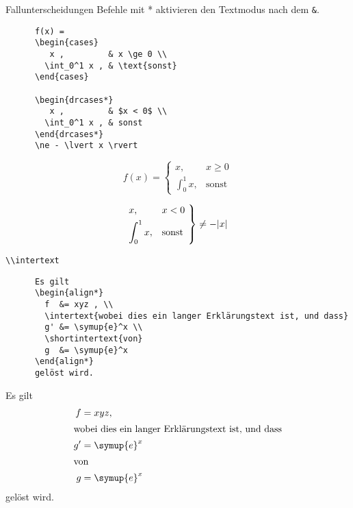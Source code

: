 \begin{frame}[fragile]{Fallunterscheidungen}
  Befehle mit * aktivieren den Textmodus nach dem \lstinline+&+.
  \begin{CodeExample}{0.55}
    \begin{lstlisting}
      f(x) =
      \begin{cases}
         x ,         & x \ge 0 \\
        \int_0^1 x , & \text{sonst}
      \end{cases}

      \begin{drcases*}
         x ,         & $x < 0$ \\
        \int_0^1 x , & sonst
      \end{drcases*}
      \ne - \lvert x \rvert
    \end{lstlisting}
  \CodeResult
    \begin{equation*}
      f(x) =
      \begin{cases}
         x ,         & x \ge 0 \\
        \int_0^1 x , & \text{sonst}
      \end{cases}
    \end{equation*}

    \vspace{5em}
    \begin{equation*}
      \begin{drcases*}
         x ,         & $x < 0$ \\
        \int_0^1 x , & sonst
      \end{drcases*}
      \ne - \lvert x \rvert
    \end{equation*}
  \end{CodeExample}
\end{frame}

\begin{frame}[fragile]{\lstinline+\\intertext+}
  \begin{CodeExample}{0.60}
    \begin{lstlisting}
      Es gilt
      \begin{align*}
        f  &= xyz , \\
        \intertext{wobei dies ein langer Erklärungstext ist, und dass}
        g' &= \symup{e}^x \\
        \shortintertext{von}
        g  &= \symup{e}^x
      \end{align*}
      gelöst wird.
    \end{lstlisting}
  \CodeResult
    Es gilt
    \begin{align*}
      f  &= xyz , \\
      \intertext{wobei dies ein langer Erklärungstext ist, und dass}
      g' &= \symup{e}^x \\
      \shortintertext{von}
      g  &= \symup{e}^x
    \end{align*}
    gelöst wird.
  \end{CodeExample}
\end{frame}

